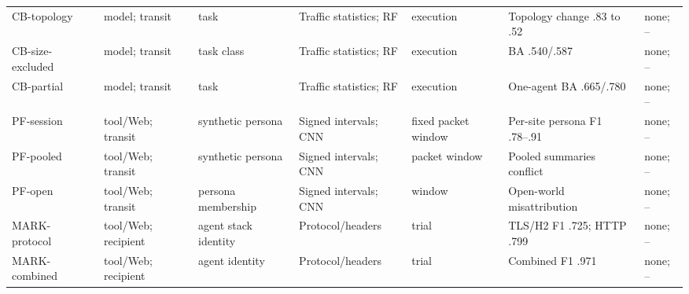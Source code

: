 \begin{table}[t]
\begin{tabularx}{\textwidth}{@{}P{.14\textwidth}P{.11\textwidth}P{.13\textwidth}P{.14\textwidth}P{.12\textwidth}Y P{.09\textwidth}@{}}
CB-topology~\cite{pouryousef2026traffic} & model; transit & task & Traffic statistics; RF & execution & Topology change .83 to .52 & none; -- \\
CB-size-excluded~\cite{pouryousef2026traffic} & model; transit & task class & Traffic statistics; RF & execution & BA .540/.587 & none; -- \\
CB-partial~\cite{pouryousef2026traffic} & model; transit & task & Traffic statistics; RF & execution & One-agent BA .665/.780 & none; -- \\
PF-session~\cite{song2026personafingerprint} & tool/Web; transit & synthetic persona & Signed intervals; CNN & fixed packet window & Per-site persona F1 .78--.91 & none; -- \\
PF-pooled~\cite{song2026personafingerprint} & tool/Web; transit & synthetic persona & Signed intervals; CNN & packet window & Pooled summaries conflict & none; -- \\
PF-open~\cite{song2026personafingerprint} & tool/Web; transit & persona membership & Signed intervals; CNN & window & Open-world misattribution & none; -- \\
MARK-protocol~\cite{kang2026whoseagent} & tool/Web; recipient & agent stack identity & Protocol/headers & trial & TLS/H2 F1 .725; HTTP .799 & none; -- \\
MARK-combined~\cite{kang2026whoseagent} & tool/Web; recipient & agent identity & Protocol/headers & trial & Combined F1 .971 & none; -- \\
\bottomrule\end{tabularx}\end{table}
